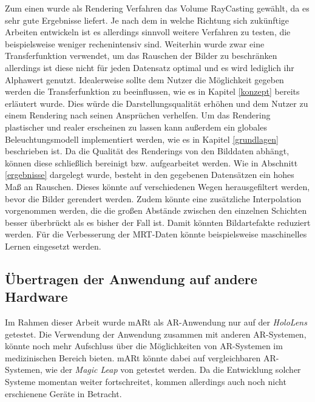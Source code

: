 Zum einen wurde als Rendering Verfahren das Volume RayCasting gewählt, da es sehr gute Ergebnisse liefert. Je nach dem in welche Richtung sich zukünftige Arbeiten entwickeln ist es allerdings sinnvoll weitere Verfahren zu testen, die beispielsweise weniger rechenintensiv sind. 
Weiterhin wurde zwar eine Transferfunktion verwendet, um das Rauschen der Bilder zu beschränken allerdings ist diese nicht für jeden Datensatz optimal und es wird lediglich ihr Alphawert genutzt. 
Idealerweise sollte dem Nutzer die Möglichkeit gegeben werden die Transferfunktion zu beeinflussen, wie es in Kapitel \ref{konzept} bereits erläutert wurde. Dies würde die Darstellungsqualität erhöhen und dem Nutzer zu einem Rendering nach seinen Ansprüchen verhelfen. 
Um das Rendering plastischer und realer erscheinen zu lassen kann außerdem ein globales Beleuchtungsmodell implementiert werden, wie es in Kapitel \ref{grundlagen} beschrieben ist. 
Da die Qualität des Renderings von den Bilddaten abhängt, können diese schließlich bereinigt bzw. aufgearbeitet werden. Wie in Abschnitt \ref{ergebnisse} dargelegt wurde, besteht in den gegebenen Datensätzen ein hohes Maß an Rauschen. Dieses könnte auf verschiedenen Wegen herausgefiltert werden, bevor die Bilder gerendert werden. Zudem könnte eine zusätzliche Interpolation vorgenommen werden, die die großen Abstände zwischen den einzelnen Schichten besser überbrückt als es bisher der Fall ist. Damit könnten Bildartefakte reduziert werden. 
Für die Verbesserung der MRT-Daten könnte beispielsweise maschinelles Lernen eingesetzt werden.

\subsection{Übertragen der Anwendung auf andere Hardware}
\label{hololens2Fazit}

Im Rahmen dieser Arbeit wurde mARt als AR-Anwendung nur auf der \textit{HoloLens} getestet. 
Die Verwendung der Anwendung zusammen mit anderen AR-Systemen, könnte noch mehr Aufschluss über die Möglichkeiten von AR-Systemen im medizinischen Bereich bieten. 
mARt könnte dabei auf vergleichbaren AR-Systemen, wie der \textit{Magic Leap} von \cite{magicLeap} getestet werden.
Da die Entwicklung solcher Systeme momentan weiter fortschreitet, kommen allerdings auch noch nicht erschienene Geräte in Betracht.

